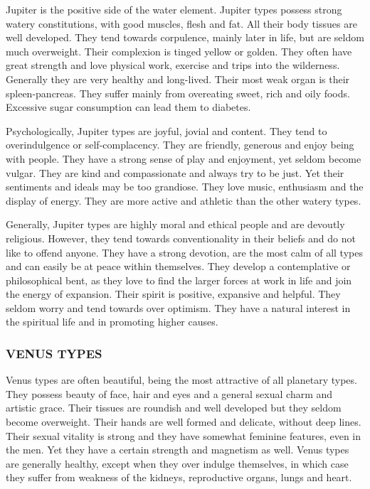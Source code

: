 Jupiter is the positive side of the water element. Jupiter types possess strong watery constitutions, with good muscles, flesh and fat. All their body tissues are well developed. They tend towards corpulence, mainly later in life, but are seldom much overweight. Their complexion is tinged yellow or golden. They often have great strength and love physical work, exercise and trips into the wilderness. Generally they are very healthy and long-lived. Their most weak organ is their spleen-pancreas. They suffer mainly from overeating sweet, rich and oily foods. Excessive sugar consumption can lead them to diabetes. 

 

Psychologically, Jupiter types are joyful, jovial and content. They tend to overindulgence or self‑complacency. They are friendly, generous and enjoy being with people. They have a strong sense of play and enjoyment, yet seldom become vulgar. They are kind and compassionate and always try to be just. Yet their sentiments and ideals may be too grandiose. They love music, enthusiasm and the display of energy. They are more active and athletic than the other watery types.

 

Generally, Jupiter types are highly moral and ethical people and are devoutly religious. However, they tend towards conventionality in their beliefs and do not like to offend anyone. They have a strong devotion, are the most calm of all types and can easily be at peace within themselves. They develop a contemplative or philosophical bent, as they love to find the larger forces at work in life and join the energy of expansion. Their spirit is positive, expansive and helpful. They seldom worry and tend towards over optimism. They have a natural interest in the spiritual life and in promoting higher causes.

 



\subsubsection{VENUS TYPES}
 

Venus types are often beautiful, being the most attractive of all planetary types. They possess beauty of face, hair and eyes and a general sexual charm and artistic grace. Their tissues are roundish and well developed but they seldom become overweight. Their hands are well formed and delicate, without deep lines. Their sexual vitality is strong and they have somewhat feminine features, even in the men. Yet they have a certain strength and magnetism as well. Venus types are generally healthy, except when they over indulge themselves, in which case they suffer from weakness of the kidneys, reproductive organs, lungs and heart.

